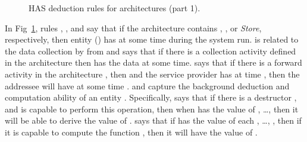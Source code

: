 \documentclass[a4paper]{article}
\begin{document}
\begin{figure}[htbp]
\centering
\fbox{\begin{minipage}{11.87 cm}
\begin{tabbing}
\\\\\\
\\\\\\
\\\\\\
\\\\\\
\\\\\\ 
\\\\\\
\\\\\\ 
\\
\end{tabbing}
\end{minipage}
}
\caption{HAS deduction rules for architectures (part 1).}
\label{tab:eq:axioms0}
\end{figure}


In Fig~\ref{tab:eq:axioms0}, 
rules , ,  and  say that if the architecture contains , ,  or \textit{Store}, respectively, then  entity  () has  at some time  during the system run.  is related to the data collection by  from  and says that if there is a collection activity defined in the architecture then  has the data  at some time.  says that if there is a forward activity in the architecture , then and the service provider has  at time , then the addressee  will have  at some time .  and  capture the background deduction and computation ability of an entity . Specifically,  says that if there is a destructor   , and  is capable to perform this operation, then when  has the value of , \dots,  then it will be able to derive  the value of .  says that if  has the value of each , \dots, , then if it is capable to compute the function , then it will have the value of . 
\end{document}

